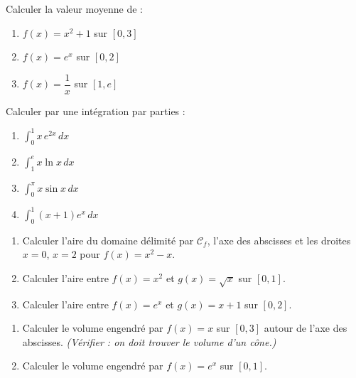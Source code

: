\begin{exercice}
  Calculer la valeur moyenne de :
  \begin{enumerate}
    \item $f(x) = x^2 + 1$ sur $[0,3]$
    \item $f(x) = e^x$ sur $[0,2]$
    \item $f(x) = \dfrac{1}{x}$ sur $[1,e]$
  \end{enumerate}
\end{exercice}

\begin{exercice}
  Calculer par une int\'{e}gration par parties :
  \begin{enumerate}
    \item $\displaystyle\int_0^1 x\,e^{2x}\,dx$
    \item $\displaystyle\int_1^e x\ln x\,dx$
    \item $\displaystyle\int_0^{\pi} x\sin x\,dx$
    \item $\displaystyle\int_0^1 (x+1)e^x\,dx$
  \end{enumerate}
\end{exercice}

\begin{exercice}
  \begin{enumerate}
    \item Calculer l'aire du domaine d\'{e}limit\'{e} par $\mathcal{C}_f$,
          l'axe des abscisses et les droites $x=0$, $x=2$
          pour $f(x) = x^2 - x$.
    \item Calculer l'aire entre $f(x) = x^2$ et $g(x) = \sqrt{x}$
          sur $[0,1]$.
    \item Calculer l'aire entre $f(x) = e^x$ et $g(x) = x + 1$
          sur $[0,2]$.
  \end{enumerate}
\end{exercice}

\begin{exercice}
  \begin{enumerate}
    \item Calculer le volume engendr\'{e} par $f(x) = x$ sur $[0,3]$
          autour de l'axe des abscisses.
          \textit{(V\'{e}rifier : on doit trouver le volume d'un c\^{o}ne.)}
    \item Calculer le volume engendr\'{e} par $f(x) = e^x$ sur $[0,1]$.
  \end{enumerate}
\end{exercice}
